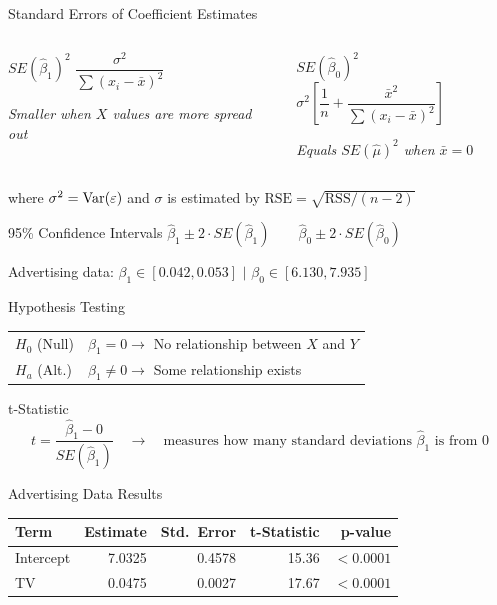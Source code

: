 \documentclass[ignorenonframetext,]{beamer}
\begin{document}
\begin{frame}{Standard Errors of Coefficient Estimates}
\begin{columns}[T]
\begin{block}{$SE(\hat\beta_1)^2$}
\centering
$\dfrac{\sigma^2}{\sum (x_i - \bar{x})^2}$

\footnotesize\textit{Smaller when $X$ values are more spread out}
\end{block}
\begin{block}{$SE(\hat\beta_0)^2$}
\centering
$\sigma^2 \left[\dfrac{1}{n} + \dfrac{\bar{x}^2}{\sum (x_i - \bar{x})^2}\right]$

\footnotesize\textit{Equals $SE(\hat\mu)^2$ when $\bar{x} = 0$}
\end{block}
\end{columns}

\begin{center}
where $\sigma^2 = \operatorname{Var}(\varepsilon)$ and $\sigma$ is estimated by $\mathrm{RSE} = \sqrt{\mathrm{RSS}/(n-2)}$
\end{center}

\begin{block}{95\% Confidence Intervals}
\centering
$\hat\beta_1 \pm 2 \cdot SE(\hat\beta_1) \qquad \hat\beta_0 \pm 2 \cdot SE(\hat\beta_0)$

\small Advertising data: $\beta_1 \in [0.042, 0.053]$ $\mid$ $\beta_0 \in [6.130, 7.935]$
\end{block}
\end{frame}

\begin{frame}{Hypothesis Testing}
\begin{tabular}{@{}ll@{}}
$H_0$ (Null) & $\beta_1 = 0 \rightarrow$ No relationship between $X$ and $Y$ \\[3pt]
$H_a$ (Alt.) & $\beta_1 \neq 0 \rightarrow$ Some relationship exists
\end{tabular}

\begin{block}{t-Statistic}
$$t = \frac{\hat\beta_1 - 0}{SE(\hat\beta_1)} \quad \rightarrow \quad \text{measures how many standard deviations } \hat\beta_1 \text{ is from 0}$$
\end{block}

\begin{block}{Advertising Data Results}
\centering
\begin{tabular}{lrrrr}
\toprule
Term & Estimate & Std.\ Error & t-Statistic & p-value \\
\midrule
Intercept & 7.0325 & 0.4578 & 15.36 & {\color{red}$< 0.0001$} \\
TV & 0.0475 & 0.0027 & 17.67 & {\color{red}$< 0.0001$} \\
\bottomrule
\end{tabular}
\end{block}
\end{frame}
\end{document}
